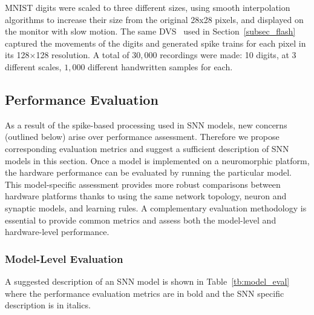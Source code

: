 MNIST digits were scaled to three different sizes, using smooth interpolation algorithms to increase their size from the original 28x28 pixels, and displayed on the monitor with slow motion. 
The same DVS~\cite{serrano2013128} used in Section~\ref{subsec_flash} captured the movements of the digits and generated spike trains for each pixel in its 128$\times$128 resolution.
A total of $30,000$ recordings were made: 10 digits, at 3 different scales, $1,000$ different handwritten samples for each.

\subsection{Performance Evaluation}
\label{sec:eval}
As a result of the spike-based processing used in SNN models, new concerns (outlined below) arise over performance assessment.
Therefore we propose corresponding evaluation metrics and suggest a sufficient description of SNN models in this section.
Once a model is implemented on a neuromorphic platform, the hardware performance can be evaluated by running the particular model.
This model-specific assessment provides more robust comparisons between hardware platforms thanks to using the same network topology, neuron and synaptic models, and learning rules. 
A complementary evaluation methodology is essential to provide common metrics and assess both the model-level and hardware-level performance.


\subsubsection{Model-Level Evaluation}
\label{subsec:model}

A suggested description of an SNN model is shown in Table~\ref{tb:model_eval} where the performance evaluation metrics are in bold and the SNN specific description is in italics.

